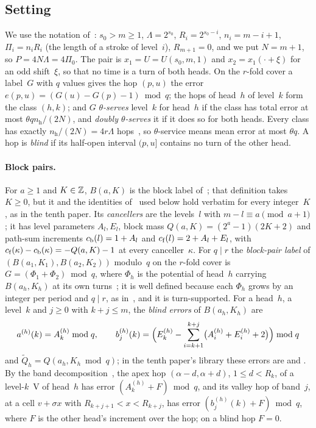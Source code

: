 \subsection{Setting}\label{sec:dnp-setting}

We use the notation of~\cite[Sections~2.5 and~5]{BoundedNesting2026}: $s_0>m\ge1$, $\Lambda=2^{s_0}$, $R_i=2^{s_0-i}$,
$n_i=m-i+1$, $\Pi_i=n_iR_i$ (the length of a stroke of level~$i$), $R_{m+1}=0$, and we put $N=m+1$, so $P=4N\Lambda=4\Pi_0$.
The pair is $x_1=U=U(s_0,m,1)$ and $x_2=x_1(\cdot+\xi)$ for an odd shift~$\xi$, so that no time is a turn of both heads.
On the $r$-fold cover a label~$G$ with $q$ values gives the hop $(p,u)$ the error $e(p,u)=(G(u)-G(p)-1)\bmod q$; the hops of
head~$h$ of level~$k$ form the class $(h,k)$; and $G$ \emph{$\theta$-serves} level~$k$ for head~$h$ if the class has total
error at most $\theta qn_{\mathrm h}/(2N)$, and \emph{doubly $\theta$-serves} it if it does so for both heads. Every class
has exactly $n_{\mathrm h}/(2N)=4r\Lambda$ hops~\cite[Lemma~5.1(c)]{BoundedNesting2026}, so $\theta$-service means mean
error at most $\theta q$. A hop is \emph{blind} if its half-open interval $(p,u]$ contains no turn of the other head.

\paragraph{Block pairs.} For $a\ge1$ and $K\in\mathbb{Z}$, $B(a,K)$ is the block label of~\cite[Definition~5.11]{BoundedNesting2026};
that definition takes $K\ge0$, but it and the identities of~\cite[Lemma~5.12]{BoundedNesting2026} used below hold verbatim
for every integer~$K$, as in the tenth paper. Its \emph{cancellers} are the levels~$l$ with $m-l\equiv a\pmod{a+1}$; it
has level parameters $A_l,E_l$, block mass $Q(a,K)=(2^a-1)(2K+2)$ and path-sum increments $c_{\mathrm{b}}(l)=1+A_l$ and
$c_{\mathrm{f}}(l)=2+A_l+E_l$, with $c_{\mathrm{f}}(\kappa)-c_{\mathrm{b}}(\kappa)=-Q(a,K)-1$ at every canceller~$\kappa$. For $q\mid r$ the
\emph{block-pair label} of $(B(a_1,K_1),B(a_2,K_2))$ modulo~$q$ on the $r$-fold cover is $G=(\Phi_1+\Phi_2)\bmod q$, where
$\Phi_h$ is the potential of head~$h$ carrying $B(a_h,K_h)$ at its own turns~\cite[Section~5.3]{BoundedNesting2026}; it is
well defined because each $\Phi_h$ grows by an integer per period and $q\mid r$, as
in~\cite[Proposition~5.23]{BoundedNesting2026}, and it is turn-supported. For a head~$h$, a level~$k$ and $j\ge0$ with
$k+j\le m$, the \emph{blind errors} of $B(a_h,K_h)$ are
\[
  a^{(h)}(k)=A^{(h)}_k\bmod q,\qquad
  b^{(h)}_j(k)=\Bigl(E^{(h)}_k-\sum_{i=k+1}^{k+j}\bigl(A^{(h)}_i+E^{(h)}_i+2\bigr)\Bigr)\bmod q
\]
and $\tilde Q_h=Q(a_h,K_h\bmod q)$; in the tenth paper's library these errors are
 and . By the band
decomposition~\cite[Lemma~5.10]{BoundedNesting2026}, the apex hop $(\alpha-d,\alpha+d)$, $1\le d<R_k$, of a level-$k$~V of
head~$h$ has error $(A^{(h)}_k+F)\bmod q$, and its valley hop of band~$j$, at a cell $v+\sigma x$ with
$R_{k+j+1}<x<R_{k+j}$, has error $(b^{(h)}_j(k)+F)\bmod q$, where $F$ is the other head's increment over the hop; on a
blind hop $F=0$.


